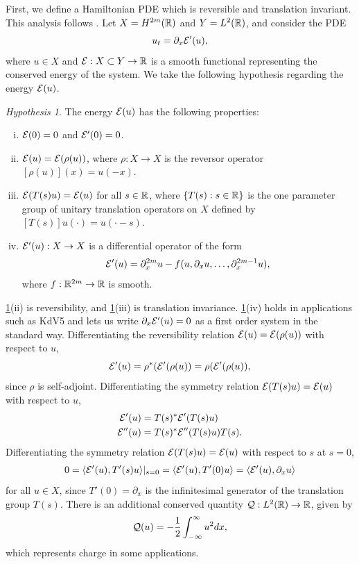 \documentclass[10pt,reqno]{amsart}
\theoremstyle{plain}
\theoremstyle{definition}
\theoremstyle{remark}
\newtheorem{hypothesis}[theorem]{Hypothesis}
\numberwithin{theorem}{section}
\numberwithin{equation}{section}
\begin{document}
First, we define a Hamiltonian PDE which is reversible and translation invariant. This analysis follows \cite{Grillakis1987}. Let $X = H^{2m}(\mathbb{R})$ and $Y = L^2(\mathbb{R})$, and consider the PDE
\begin{equation}\label{genPDE}
u_t = \partial_x \mathcal{E}'(u),
\end{equation}
where $u \in X$ and $\mathcal{E}: X \subset Y \rightarrow \mathbb{R}$ is a smooth functional representing the conserved energy of the system. We take the following hypothesis regarding the energy $\mathcal{E}(u)$.

\begin{hypothesis}\label{hyp:E}
The energy $\mathcal{E}(u)$ has the following properties:
\begin{enumerate}[(i)]
\item $\mathcal{E}(0) = 0$ and $\mathcal{E}'(0) = 0$.
\item $\mathcal{E}(u) = \mathcal{E}(\rho(u))$, where $\rho: X \rightarrow X$ is the reversor operator $[\rho(u)](x) = u(-x)$.
\item $\mathcal{E}(T(s)u) = \mathcal{E}(u)$ for all $s \in \mathbb{R}$, where $\{T(s) : s \in \mathbb{R} \}$ is the one parameter group of unitary translation operators on $X$ defined by $[T(s)]u(\cdot) = u(\cdot - s)$.
\item $\mathcal{E}'(u): X \rightarrow X$ is a differential operator of the form
\begin{equation}\label{Eprimeuform}
\mathcal{E}'(u) = \partial_x^{2m}u - f(u, \partial_x u, \dots, \partial_x^{2m-1} u),
\end{equation}
where $f: \mathbb{R}^{2m} \rightarrow \mathbb{R}$ is smooth.
\end{enumerate}
\end{hypothesis}

\noi \cref{hyp:E}(ii) is reversibility, and \cref{hyp:E}(iii) is translation invariance. \cref{hyp:E}(iv) holds in applications such as KdV5 and lets us write $\partial_x \mathcal{E}'(u) = 0$ as a first order system in the standard way. Differentiating the reversibility relation $\mathcal{E}(u) = \mathcal{E}(\rho(u))$ with respect to $u$,
\[
\mathcal{E}'(u) = \rho^*( \mathcal{E}'(\rho(u) ) = \rho( \mathcal{E}'(\rho(u) ),
\]
since $\rho$ is self-adjoint. Differentiating the symmetry relation $\mathcal{E}(T(s)u) = \mathcal{E}(u)$ with respect to $u$,
\begin{align}
\mathcal{E}'(u) &= T(s)^* \mathcal{E}'(T(s)u) \label{Eprimesymm} \\
\mathcal{E}''(u) &= T(s)^* \mathcal{E}''(T(s)u) T(s). \label{EHessiansymm}
\end{align}
Differentiating the symmetry relation $\mathcal{E}(T(s)u) = \mathcal{E}(u)$ with respect to $s$ at $s = 0$, 
\begin{align*}
0 = \langle \mathcal{E}'(u), T'(s) u \rangle|_{s = 0}
= \langle \mathcal{E}'(u), T'(0) u \rangle
= \langle \mathcal{E}'(u), \partial_x u \rangle
\end{align*}
for all $u \in X$, since $T'(0) = \partial_x$ is the infinitesimal generator of the translation group $T(s)$. There is an additional conserved quantity $\mathcal{Q}: L^2(\mathbb{R}) \rightarrow \mathbb{R}$, given by
\begin{equation}\label{defV}
\mathcal{Q}(u) = -\frac{1}{2} \int_{-\infty}^\infty u^2 dx,
\end{equation}
which represents charge in some applications. 
\end{document}
